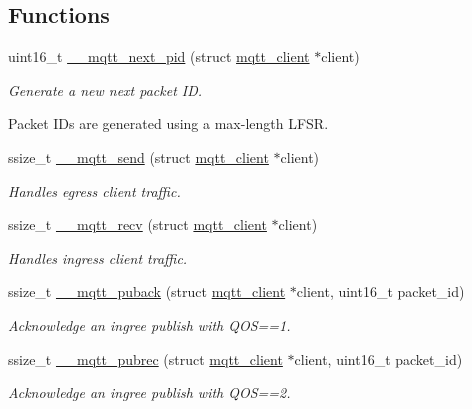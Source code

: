 \subsection*{Functions}
\begin{DoxyCompactItemize}
\item 
uint16\+\_\+t \hyperlink{group__details_ga7ca75c661980d4af50493f59a386f378}{\+\_\+\+\_\+mqtt\+\_\+next\+\_\+pid} (struct \hyperlink{structmqtt__client}{mqtt\+\_\+client} $\ast$client)
\begin{DoxyCompactList}\small\item\em Generate a new next packet ID.

Packet ID\textquotesingle{}s are generated using a max-\/length L\+F\+SR. \end{DoxyCompactList}\item 
ssize\+\_\+t \hyperlink{group__details_gacf553ca88f48350dbde0dc3b96e550f7}{\+\_\+\+\_\+mqtt\+\_\+send} (struct \hyperlink{structmqtt__client}{mqtt\+\_\+client} $\ast$client)
\begin{DoxyCompactList}\small\item\em Handles egress client traffic. \end{DoxyCompactList}\item 
ssize\+\_\+t \hyperlink{group__details_ga4d50a465c684a5ecd1c000f811fa601e}{\+\_\+\+\_\+mqtt\+\_\+recv} (struct \hyperlink{structmqtt__client}{mqtt\+\_\+client} $\ast$client)
\begin{DoxyCompactList}\small\item\em Handles ingress client traffic. \end{DoxyCompactList}\item 
ssize\+\_\+t \hyperlink{group__details_gae09d4412a871ecec31377db55cc54228}{\+\_\+\+\_\+mqtt\+\_\+puback} (struct \hyperlink{structmqtt__client}{mqtt\+\_\+client} $\ast$client, uint16\+\_\+t packet\+\_\+id)
\begin{DoxyCompactList}\small\item\em Acknowledge an ingree publish with Q\+OS==1. \end{DoxyCompactList}\item 
ssize\+\_\+t \hyperlink{group__details_ga874c62f7a20b6adf13dbed2b4e2dd985}{\+\_\+\+\_\+mqtt\+\_\+pubrec} (struct \hyperlink{structmqtt__client}{mqtt\+\_\+client} $\ast$client, uint16\+\_\+t packet\+\_\+id)
\begin{DoxyCompactList}\small\item\em Acknowledge an ingree publish with Q\+OS==2. \end{DoxyCompactList}\item 

\end{DoxyCompactItemize}
